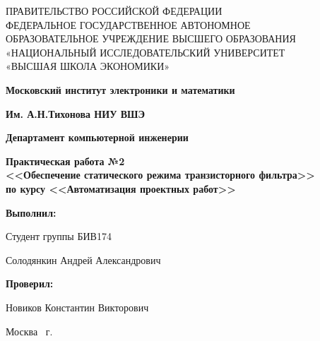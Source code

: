 \begin{titlepage}
	\begin{center}
		ПРАВИТЕЛЬСТВО РОССИЙСКОЙ ФЕДЕРАЦИИ \\
 		ФЕДЕРАЛЬНОЕ  ГОСУДАРСТВЕННОЕ АВТОНОМНОЕ \\
		ОБРАЗОВАТЕЛЬНОЕ УЧРЕЖДЕНИЕ ВЫСШЕГО ОБРАЗОВАНИЯ\\
		«НАЦИОНАЛЬНЫЙ ИССЛЕДОВАТЕЛЬСКИЙ УНИВЕРСИТЕТ\\
		«ВЫСШАЯ ШКОЛА ЭКОНОМИКИ»
	\end{center}
	
	\begin{center}
		\textbf{Московский институт электроники и математики}
		
		\textbf{Им. А.Н.Тихонова НИУ ВШЭ}
		
		\vspace{2ex}
		
		\textbf{Департамент компьютерной инженерии}
	\end{center}
	\vspace{1ex}	
	
	\vspace{1ex}
	\begin{center}
		\textbf{Практическая работа №2 \\
			<<Обеспечение статического режима транзисторного фильтра>> \\
			по курсу <<Автоматизация проектных работ>>\\
	}
	\end{center}	

	\vspace{2ex}
	\vfill
	
	\vspace{2ex}
	
	\begin{flushright}
		\textbf{Выполнил:}
		
		\vspace{2ex}
		
		Студент группы БИВ174
		
		\vspace{2ex}
		
	Солодянкин Андрей Александрович
		
		\vspace{2ex}
		
		\textbf{Проверил:}
		
		\vspace{2ex}
		
		Новиков Константин Викторович
	\end{flushright}

	\vspace{5ex}
	\begin{center}
		Москва \the\year \, г.
	\end{center}
	
\end{titlepage}
\addtocounter{page}{1}